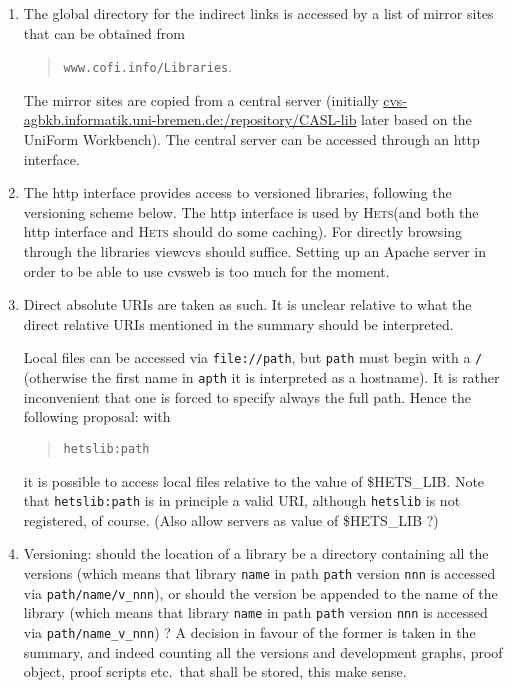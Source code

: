 \documentclass{article}
\newcommand{\Hets}{\textmd{\textsc{Hets}}\xspace }
\begin{document}
\begin{enumerate}
\item 
The global directory for the indirect links is accessed by a list of
mirror sites that can be obtained from 
\begin{quote}\texttt{www.cofi.info/Libraries}.\end{quote} 
The
mirror sites are copied from a central server (initially
\url{cvs-agbkb.informatik.uni-bremen.de:/repository/CASL-lib}
later based on the UniForm Workbench). 
The central server can be accessed through an http interface. 

\item
The http interface provides access to versioned libraries,
following the versioning scheme below.
The http interface is
used by \Hets (and both the http interface and \Hets should do some
caching). For directly browsing through the libraries viewcvs should
suffice. Setting up an Apache server in order to be able to use cvsweb
is too much for the moment.
\label{global-server}

\item 
Direct absolute URIs are taken as such. 
It is unclear relative to what the direct relative
URIs mentioned in the summary should be interpreted.

Local files can be accessed via \texttt{file://path},
but \texttt{path} must begin with a \texttt{/}
(otherwise the first name in \texttt{apth} it is interpreted as a hostname).
It is rather inconvenient that one is forced to specify
always the full path.
Hence the following proposal: with
\begin{quote}\texttt{hetslib:path}\end{quote}
it is possible to access local files relative to the value of \$HETS\_LIB.
Note that \texttt{hetslib:path} is in principle a valid URI,
although \texttt{hetslib} is not registered, of course.
(Also allow servers as value of \$HETS\_LIB ?)

\item 
Versioning: should the location of a library be a directory
containing all the versions (which means that library
\texttt{name} in path \texttt{path} version \texttt{nnn} is accessed via \texttt{path/name/v\_nnn}), 
or should the version be appended to the name of the library (which
means that library \texttt{name} in path \texttt{path} version \texttt{nnn} is accessed via
\texttt{path/name\_v\_nnn}) ? 
A decision in favour of the former is taken in the summary, and
indeed counting all the versions and development graphs, proof object, proof scripts
etc.\ that shall be stored, this make sense.


\end{enumerate}
\end{document}
